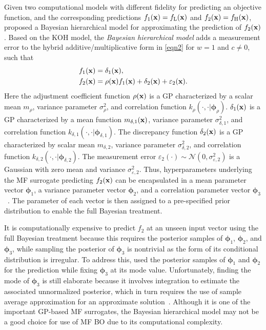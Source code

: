\documentclass[iicol,sn-basic]{sn-jnl}%
\begin{document}
Given two computational models with different fidelity for predicting an objective function, and the corresponding predictions $f_1({\bf x})= f_\text{L}({\bf x})$ and $f_2({\bf x})= f_\text{H}({\bf x})$,
\cite{Qian2008} proposed a Bayesian hierarchical model for approximating the prediction of $f_\text{2}({\bf x})$.
Based on the KOH model, the \textit{Bayesian hierarchical model} adds a measurement error to the hybrid additive/multiplicative form in \cref{eqn2} for $w=1$ and $c \neq 0$, such that
\begin{subequations}\label{eqn19}
	\begin{align}
		f_1({\bf x}) & = \delta_1({\bf x}) \label{eqn19-1},\\
		f_\text{2}({\bf x}) & = \rho({\bf x})f_\text{1}({\bf x}) + \delta_2({\bf x})+\varepsilon_2({\bf x}) \label{eqn19-2}.
	\end{align}
\end{subequations}
Here the adjustment coefficient function $\rho({\bf x})$ is a GP characterized by a scalar mean $m_\rho$, variance parameter $\sigma^2_\rho$, and correlation function $k_\rho(\cdot,\cdot|{\boldsymbol \phi}_\rho)$.
$\delta_\text{1}({\bf x})$ is a GP characterized by a mean function $m_{\delta,1}({\bf x})$, variance parameter $\sigma^2_{\delta,1}$, and correlation function $k_{\delta,1}(\cdot,\cdot|{\boldsymbol \phi}_{\delta,1})$.
The discrepancy function $\delta_2({\bf x})$ is a GP characterized by scalar mean $m_{\delta,2}$, variance parameter $\sigma^2_{\delta,2}$, and correlation function $k_{\delta,2}(\cdot,\cdot|{\boldsymbol \phi}_{\delta,2})$.
The measurement error $\varepsilon_\text{2}(\cdot) \sim \mathcal{N}(0,\sigma^2_{\varepsilon,2})$ is a Gaussian with zero mean and variance $\sigma^2_{\varepsilon,2}$.
Thus, hyperparameters underlying the MF surrogate predicting $f_\text{2}({\bf x})$ can be encapsulated in a mean parameter vector ${\boldsymbol \phi}_1$, a variance parameter vector ${\boldsymbol \phi}_2$, and
a correlation parameter vector ${\boldsymbol \phi}_3$~\citep{Qian2008}. 
The parameter of each vector is then assigned to a pre-specified prior distribution to enable the full Bayesian treatment.

It is computationally expensive to predict $f_2$ at an unseen input vector using the full Bayesian treatment because this requires the posterior samples of ${\boldsymbol \phi}_1$, ${\boldsymbol \phi}_2$, and ${\boldsymbol \phi}_3$, while sampling the posterior of ${\boldsymbol \phi}_3$ is nontrivial as the form of its conditional distribution is irregular.
To address this, \cite{Qian2008} used the posterior samples of ${\boldsymbol \phi}_1$ and ${\boldsymbol \phi}_2$ for the prediction while fixing ${\boldsymbol \phi}_3$ at its mode value.
Unfortunately, finding the mode of ${\boldsymbol \phi}_3$ is still elaborate because it involves integration to estimate the associated unnormalized posterior, which in turn requires the use of sample average approximation for an approximate solution~\citep{Verweij2003}.
Although it is one of the important GP-based MF surrogates, the Bayesian hierarchical model may not be a good choice for use of MF BO due to its computational complexity.
\end{document}
